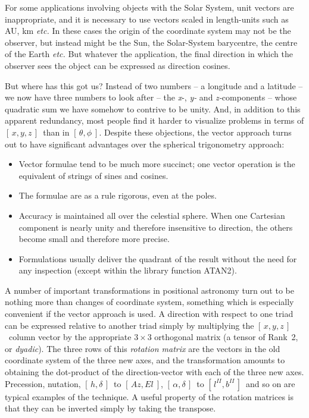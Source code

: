 \documentclass[11pt,twoside]{article}
\newcommand{\radec}     {$[\,\alpha,\delta\,]$}
\newcommand{\hadec}     {$[\,h,\delta\,]$}
\newcommand{\azel}      {$[\,Az,El~]$}
\newcommand{\gal}       {$[\,l^{I\!I},b^{I\!I}\,]$}
\newcommand{\xyz}       {$[\,x,y,z\,]$}
\begin{document}
For some applications involving objects
with the Solar System, unit vectors are inappropriate, and
it is necessary to use vectors scaled in length-units such as
AU, km {\it etc.}
In these cases the origin of the coordinate system may not be
the observer, but instead might be the Sun, the Solar-System
barycentre, the centre of the Earth {\it etc.}  But whatever the application,
the final direction in which the observer sees the object can be
expressed as direction cosines.

But where has this got us?  Instead of two numbers -- a longitude and
a latitude -- we now have three numbers to look after
-- the {\it x}-, {\it y-} and
{\it z-}components -- whose quadratic sum we have somehow to contrive to
be unity.  And, in addition to this apparent redundancy,
most people find it harder to visualize
problems in terms of \xyz\ than in $[\,\theta,\phi~]$.
Despite these objections, the vector approach turns out to have
significant advantages over the spherical trigonometry approach:
\begin{itemize}
\item Vector formulae tend to be much more succinct;  one vector
      operation is the equivalent of strings of sines and cosines.
\item The formulae are as a rule rigorous, even at the poles.
\item Accuracy is maintained all over the celestial sphere.
      When one Cartesian component is nearly unity and
      therefore insensitive to direction, the others become small
      and therefore more precise.
\item Formulations usually deliver the quadrant of the result
      without the need for any inspection (except within the
      library function ATAN2).
\end{itemize}
A number of important transformations in positional
astronomy turn out to be nothing more than changes of coordinate
system, something which is especially convenient if
the vector approach is used.  A direction with respect
to one triad can be expressed relative to another triad simply
by multiplying the \xyz\ column vector by the appropriate
$3\times3$ orthogonal matrix
(a tensor of Rank~2, or {\it dyadic}).  The three rows of this
{\it rotation matrix}\/
are the vectors in the old coordinate system of the three
new axes, and the transformation amounts to obtaining the
dot-product of the direction-vector with each of the three
new axes.  Precession, nutation, \hadec\ to \azel,
\radec\ to \gal\ and so on are typical examples of the
technique.  A useful property of the rotation matrices
is that they can be inverted simply by taking the transpose.
\end{document}
